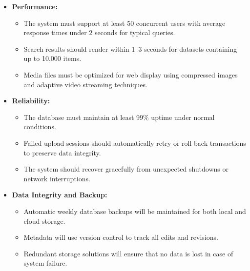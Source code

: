 \begin{itemize}

\item \textbf{Performance:}
\begin{itemize}
\item The system must support at least 50 concurrent users with average response times under 2 seconds for typical queries.
\item Search results should render within 1--3 seconds for datasets containing up to 10,000 items.
\item Media files must be optimized for web display using compressed images and adaptive video streaming techniques.
\end{itemize}

\item \textbf{Reliability:}
\begin{itemize}
\item The database must maintain at least 99\% uptime under normal conditions.
\item Failed upload sessions should automatically retry or roll back transactions to preserve data integrity.
\item The system should recover gracefully from unexpected shutdowns or network interruptions.
\end{itemize}


\item \textbf{Data Integrity and Backup:}
\begin{itemize}
\item Automatic weekly database backups will be maintained for both local and cloud storage.
\item Metadata will use version control to track all edits and revisions.
\item Redundant storage solutions will ensure that no data is lost in case of system failure.
\end{itemize}


\end{itemize}
